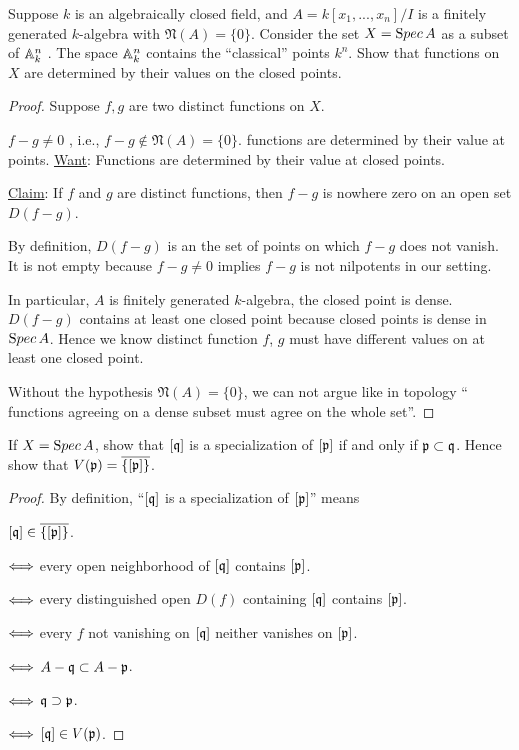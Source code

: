 \documentclass[11pt,fleqn]{book}
\begin{document}
\begin{exr}
Suppose $k$ is an algebraically closed field, and $A=k[x_1,...,x_n]/I$ is a finitely generated $k$-algebra with $\mathfrak{N}(A) = \{0\}$. Consider the set $X = {\text Spec\,} A$ as a subset of $\mathbb A^n_k$ . The space $\mathbb A^n_k$ contains the “classical” points $k^n$. Show that functions on $X$ are determined by their values on the closed points.
\end{exr}
\begin{proof}
Suppose $f,g$ are two distinct functions on $X$.

$f-g\neq 0$ , i.e., $f-g\notin \mathfrak{N}(A)=\{0\}$. functions are determined by their value at points. \underline{Want}: Functions are determined by their value at closed points.

\underline{Claim}: If $f$ and $g$ are distinct functions, then $f-g$ is nowhere zero on an open set $D(f-g)$.

By definition, $D(f-g)$ is an the set of points on which $f-g$ does not vanish. It is not empty because $f-g\neq 0$ implies $f-g$ is not nilpotents in our setting. 

In particular, $A$ is finitely generated $k$-algebra, the closed point is dense. $D(f-g)$ contains at least one closed point because closed points is dense in ${\text Spec\,} A$. Hence we know distinct function $f$, $g$ must have different values on at least one closed point.

Without the hypothesis $\mathfrak{N}(A)=\{0\}$, we can not argue like in topology `` functions agreeing on a dense subset must agree on the whole set''.
\end{proof}

\begin{exr}
If $ X = {\text Spec\,} A$, show that $[\mathfrak q]$ is a specialization of $[{\mathfrak p}]$ if and only if ${\mathfrak p} \subset \mathfrak q$. Hence show that $V({\mathfrak p}) = \overline{\{[{\mathfrak p}]\}}$.
\end{exr}
\begin{proof}
By definition, ``$[\mathfrak q]$ is a specialization of $[{\mathfrak p}]$'' means

 $[\mathfrak q]\in\overline{\{[{\mathfrak p}]\}}$.

$\Longleftrightarrow$ every open neighborhood of $[\mathfrak q]$ contains $[{\mathfrak p}]$.

$\Longleftrightarrow$ every distinguished open $D(f)$ containing $[\mathfrak q]$ contains $[{\mathfrak p}]$.

$\Longleftrightarrow$ every $f$ not vanishing on $[\mathfrak q]$ neither vanishes on $[{\mathfrak p}]$.

$\Longleftrightarrow$ $A-\mathfrak q\subset A-{\mathfrak p}$.

$\Longleftrightarrow$ $\mathfrak q\supset {\mathfrak p}$.

$\Longleftrightarrow$ $[\mathfrak q]\in V({\mathfrak p})$.
\end{proof}
\end{document}
